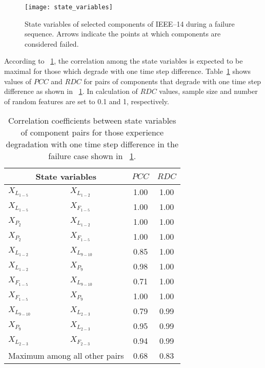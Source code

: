 \documentclass[12pt]{elsarticle}
\begin{document}
\begin{figure}
\centering
\texttt{[image: state\_variables]}
\caption{State variables of selected components of IEEE--14 during a failure sequence. Arrows indicate the points at which components are considered failed.}
\label{fig:state_variables}
\end{figure}

According to \figurename~\ref{fig:state_variables}, the correlation among the state variables is expected to be maximal for those which degrade with one time step difference. Table~\ref{tab:cor_state_variables} shows values of $PCC$ and $RDC$ for pairs of components that degrade with one time step difference as shown in \figurename~\ref{fig:state_variables}. In calculation of $RDC$ values, sample size and number of random features are set to 0.1 and 1, respectively.

\begin{table}
\centering
\caption{Correlation coefficients between state variables of component pairs for those experience degradation with one time step difference in the failure case shown in \figurename~\ref{fig:state_variables}.}
\label{tab:cor_state_variables}
\begin{tabular}{ll|cc}
\multicolumn{2}{c|}{State variables} & $PCC$ & $RDC$ \\ \hline
$X_{L_{1-5}}$  & $X_{L_{1-2}}$       & 1.00  & 1.00  \\
$X_{L_{1-5}}$  & $X_{F_{1-5}}$       & 1.00  & 1.00  \\
$X_{P_{2}}$    & $X_{L_{1-2}}$       & 1.00  & 1.00  \\
$X_{P_{2}}$    & $X_{F_{1-5}}$       & 1.00  & 1.00  \\
$X_{L_{1-2}}$  & $X_{L_{9-10}}$      & 0.85  & 1.00  \\
$X_{L_{1-2}}$  & $X_{P_{9}}$         & 0.98  & 1.00  \\
$X_{F_{1-5}}$  & $X_{L_{9-10}}$      & 0.71  & 1.00  \\
$X_{F_{1-5}}$  & $X_{P_{9}}$         & 1.00  & 1.00  \\
$X_{L_{9-10}}$ & $X_{L_{2-3}}$       & 0.79  & 0.99  \\
$X_{P_{9}}$    & $X_{L_{2-3}}$       & 0.95  & 0.99  \\
$X_{L_{2-3}}$  & $X_{F_{2-3}}$       & 0.94  & 0.99  \\[2pt] \hline
\multicolumn{2}{m{0.26\columnwidth}|}{Maximum among all other pairs} & 0.68 & 0.83
\end{tabular}
\end{table}
\end{document}
